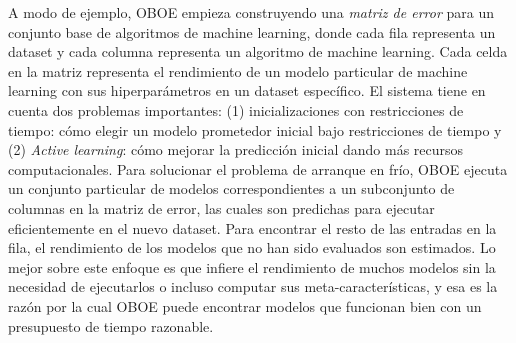 A modo de ejemplo, OBOE \cite{yang2018oboe} empieza construyendo una \textit{matriz de error} para un conjunto base de algoritmos de machine learning, donde cada fila representa un dataset y cada columna representa un algoritmo de machine learning. Cada celda en la matriz representa el rendimiento de un modelo particular de machine learning con sus hiperparámetros en un dataset específico. El sistema tiene en cuenta dos problemas importantes: (1) inicializaciones con restricciones de tiempo: cómo elegir un modelo prometedor inicial bajo restricciones de tiempo y (2) \textit{Active learning}: cómo mejorar la predicción inicial dando más recursos computacionales. Para solucionar el problema de arranque en frío, OBOE ejecuta un conjunto particular de modelos correspondientes a un subconjunto de columnas en la matriz de error, las cuales son predichas para ejecutar eficientemente en el nuevo dataset. Para encontrar el resto de las entradas en la fila, el rendimiento de los modelos que no han sido evaluados son estimados. Lo mejor sobre este enfoque es que infiere el rendimiento de muchos modelos sin la necesidad de ejecutarlos o incluso computar sus meta-características, y esa es la razón por la cual OBOE puede encontrar modelos que funcionan bien con un presupuesto de tiempo razonable.


